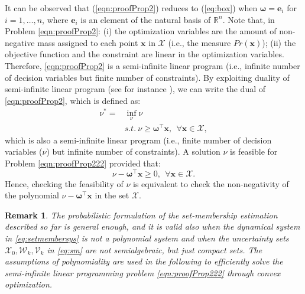 \documentclass[twocolumn]{autart}
\newtheorem{remark}{Remark}{\normalfont}{\normalfont}
\begin{document}

It can be observed that (\ref{eqn:proofProp2}) reduces to (\ref{eq:box}) when   $\boldsymbol{\omega}=\mathbf{e}_i$ for $i=1,\dots,n$,
 where $\mathbf{e}_i$ is an element of the natural basis of $\mathbb{R}^n$.
Note that, in Problem \eqref{eqn:proofProp2}: (i) the optimization
variables are the amount of non-negative mass assigned to
each point $\mathbf{x}$ in $\mathcal{X}$ (i.e., the measure $Pr(\mathbf{x})$); (ii) the objective function
and the constraint are linear in the optimization variables. Therefore, \eqref{eqn:proofProp2} is a semi-infinite linear
program (i.e., infinite number of decision variables but finite number of constraints).
By exploiting duality of semi-infinite linear program (see for instance \cite{2001Ala}), we can write the dual of \eqref{eqn:proofProp2}, which is defined as:
\begin{align}
\nonumber
\nu^*=& \inf_{\nu}  \nu\\
\label{eqn:proofProp222}
& s.t. \  \nu \geq \boldsymbol{\omega}^{\top}   \mathbf{x}, \ \ \forall  \mathbf{x} \in \mathcal{X},
\end{align}
which is also a  semi-infinite linear
program (i.e., finite number of decision variables ($\nu$) but infinite number of constraints).
A solution $\nu$ is feasible for Problem  \eqref{eqn:proofProp222} provided that:
$$
 \nu - \boldsymbol{\omega}^{\top}  \mathbf{x} \geq0, ~~\forall  \mathbf{x} \in \mathcal{X}.
$$
Hence, checking the feasibility of $\nu$  is equivalent to check the non-negativity of the polynomial  $\nu - \boldsymbol{\omega}^{\top}  \mathbf{x}$ in the set $\mathcal{X}$. %
\begin{remark}
The probabilistic formulation of the set-membership estimation described so far is general enough, and it is valid also when the dynamical system in \eqref{eq:setmembersys} is not a polynomial system and when the   uncertainty sets $\mathcal{X}_0,\mathcal{W}_k,\mathcal{V}_k$ in \eqref{eq:sm} are not semialgebraic, but just compact sets. The assumptions of polynomiality  are used in the following to efficiently solve the semi-infinite linear programming problem \eqref{eqn:proofProp222} through convex optimization.
\end{remark}
\end{document}

